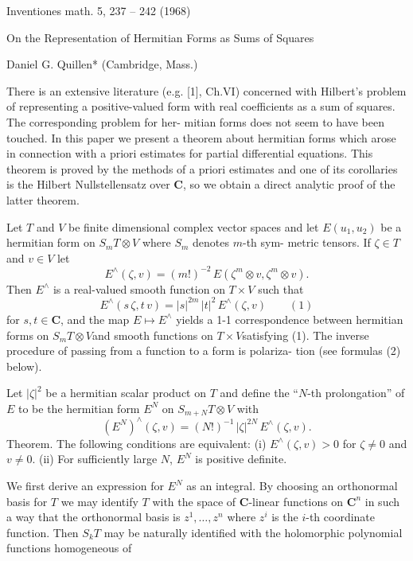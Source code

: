 \documentclass[11pt]{article}
\newcommand{\scanpage}[1]{\par\bigskip\noindent{\small\sffamily[scan #1]}\par}
\newcommand{\mspage}[1]{{\small\sffamily[p.\,#1]}}
\newcommand{\hand}[1]{\textcolor{blue}{#1}}
\begin{document}
\mspage{\hand{48}}

\clearpage
\scanpage{162-5/50}
Inventiones math. 5, 237 -- 242 (1968)

On the Representation of Hermitian Forms
as Sums of Squares

Daniel G. Quillen* (Cambridge, Mass.)

There is an extensive literature (e.g. [1], Ch.VI) concerned with
Hilbert's problem of representing a positive-valued form with real
coefficients as a sum of squares. The corresponding problem for her-%
mitian forms does not seem to have been touched. In this paper we
present a theorem about hermitian forms which arose in connection
with a priori estimates for partial differential equations. This theorem is
proved by the methods of a priori estimates and one of its corollaries
is the Hilbert Nullstellensatz over $\mathbf{C}$, so we obtain a direct analytic proof
of the latter theorem.

Let $T$ and $V$ be finite dimensional complex vector spaces and let
$E(u_1,u_2)$ be a hermitian form on $S_m T\otimes V$ where $S_m$ denotes $m$-th sym-%
metric tensors. If $\zeta\in T$ and $v\in V$ let
\[ E^{\wedge}(\zeta,v)=(m!)^{-2}\,E(\zeta^m\otimes v,\zeta^m\otimes v). \]
Then $E^{\wedge}$ is a real-valued smooth function on $T\times V$ such that
\[ E^{\wedge}(s\,\zeta,t\,v)=|s|^{2m}\,|t|^2\,E^{\wedge}(\zeta,v) \qquad (1) \]
for $s,t\in\mathbf{C}$, and the map $E\mapsto E^{\wedge}$ yields a 1-1 correspondence between
hermitian forms on $S_m T\otimes V$and smooth functions on $T\times V$satisfying (1).
The inverse procedure of passing from a function to a form is polariza-%
tion (see formulas (2) below).

Let $|\zeta|^2$ be a hermitian scalar product on $T$ and define the ``$N$-th
prolongation'' of $E$ to be the hermitian form $E^N$ on $S_{m+N}T\otimes V$ with
\[ (E^N)^{\wedge}(\zeta,v)=(N!)^{-1}\,|\zeta|^{2N}\,E^{\wedge}(\zeta,v). \]
Theorem. The following conditions are equivalent:
(i) $E^{\wedge}(\zeta,v)>0$ for $\zeta\neq 0$ and $v\neq 0$.
(ii) For sufficiently large $N$, $E^N$ is positive definite.

We first derive an expression for $E^N$ as an integral. By choosing an
orthonormal basis for $T$ we may identify $T$ with the space of $\mathbf{C}$-linear
functions on $\mathbf{C}^n$ in such a way that the orthonormal basis is $z^1,\dots,z^n$
where $z^i$ is the $i$-th coordinate function. Then $S_k T$ may be naturally
identified with the holomorphic polynomial functions homogeneous of
\end{document}
